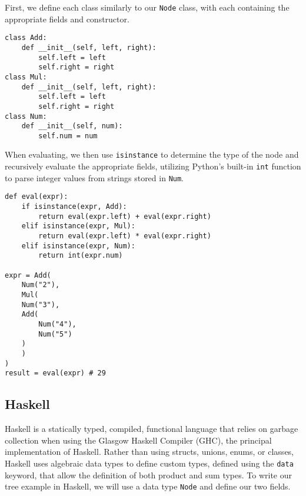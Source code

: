 \documentclass[12pt, letterpaper]{article}
\begin{document}
First, we define each class similarly to our \texttt{Node} class, with each containing the appropriate fields and constructor.
\begin{verbatim}
class Add:
    def __init__(self, left, right):
        self.left = left
        self.right = right
class Mul:
    def __init__(self, left, right):
        self.left = left
        self.right = right
class Num:
    def __init__(self, num):
        self.num = num
\end{verbatim}
When evaluating, we then use \texttt{isinstance} to determine the type of the node and recursively evaluate the appropriate fields, utilizing Python's built-in \texttt{int} function to parse integer values from strings stored in \texttt{Num}.\autocite{python-functions}
\begin{verbatim}
def eval(expr):
    if isinstance(expr, Add):
        return eval(expr.left) + eval(expr.right)
    elif isinstance(expr, Mul):
        return eval(expr.left) * eval(expr.right)
    elif isinstance(expr, Num):
        return int(expr.num)

expr = Add(
    Num("2"),
    Mul(
	Num("3"),
	Add(
	    Num("4"),
	    Num("5")
	)
    )
)
result = eval(expr) # 29
\end{verbatim}

\subsection{Haskell}
Haskell is a statically typed, compiled, functional language that relies on garbage collection when using the Glasgow Haskell Compiler (GHC), the principal implementation of Haskell.\autocite[\S~5.7]{ghc} Rather than using structs, unions, enums, or classes, Haskell uses algebraic data types to define custom types, defined using the \texttt{data} keyword, that allow the definition of both product and sum types. To write our tree example in Haskell, we will use a data type \texttt{Node} and define our two fields.\autocite[\href{https://www.haskell.org/onlinereport/haskell2010/haskellch4.html}{chap.~4}]{haskell-report}
\end{document}
